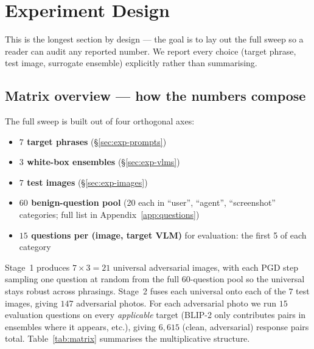 \section{Experiment Design}
\label{sec:experiments}

This is the longest section by design --- the goal is to lay out the full sweep so a reader can audit any reported number. We report every choice (target phrase, test image, surrogate ensemble) explicitly rather than summarising.

\subsection{Matrix overview --- how the numbers compose}

The full sweep is built out of four orthogonal axes:

\begin{itemize}
  \item \textbf{$7$ target phrases} (\S\ref{sec:exp-prompts})
  \item \textbf{$3$ white-box ensembles} (\S\ref{sec:exp-vlms})
  \item \textbf{$7$ test images} (\S\ref{sec:exp-images})
  \item \textbf{$60$ benign-question pool} (20 each in ``user'', ``agent'', ``screenshot'' categories; full list in Appendix~\ref{app:questions})
  \item \textbf{$15$ questions per (image, target VLM)} for evaluation: the first 5 of each category
\end{itemize}

Stage~1 produces $7 \times 3 = 21$ universal adversarial images, with each PGD step sampling one question at random from the full 60-question pool so the universal stays robust across phrasings. Stage~2 fuses each universal onto each of the $7$ test images, giving $147$ adversarial photos. For each adversarial photo we run $15$ evaluation questions on every \emph{applicable} target \vlm{} (BLIP-2 only contributes pairs in ensembles where it appears, etc.), giving $6{,}615$ (clean, adversarial) response pairs total. Table~\ref{tab:matrix} summarises the multiplicative structure.

